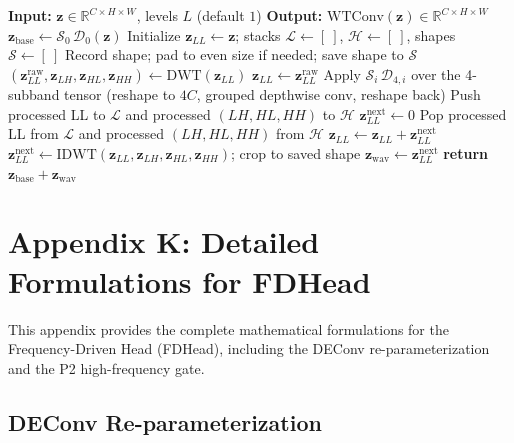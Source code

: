 \documentclass{article}
\theoremstyle{plain}
\theoremstyle{definition}
\theoremstyle{remark}
\begin{document}
 \begin{algorithm}[H]
 \caption{WTConv forward pass (used in LGE-W).}
 \label{alg:wtconv}
 \scriptsize
\begin{algorithmic}
   \STATE \textbf{Input:} $\mathbf{z}\in\mathbb{R}^{C\times H\times W}$, levels $L$ (default $1$)
   \STATE \textbf{Output:} $\mathrm{WTConv}(\mathbf{z})\in\mathbb{R}^{C\times H\times W}$
   \STATE $\mathbf{z}_{\mathrm{base}} \leftarrow \mathcal{S}_0\,\mathcal{D}_0(\mathbf{z})$ 
   \STATE Initialize $\mathbf{z}_{LL} \leftarrow \mathbf{z}$; stacks $\mathcal{L}\leftarrow[\ ]$, $\mathcal{H}\leftarrow[\ ]$, shapes $\mathcal{S}\leftarrow[\ ]$
     \STATE Record shape; pad to even size if needed; save shape to $\mathcal{S}$
     \STATE $(\mathbf{z}_{LL}^{\mathrm{raw}},\mathbf{z}_{LH},\mathbf{z}_{HL},\mathbf{z}_{HH}) \leftarrow \mathrm{DWT}(\mathbf{z}_{LL})$
     \STATE $\mathbf{z}_{LL} \leftarrow \mathbf{z}_{LL}^{\mathrm{raw}}$ 
     \STATE Apply $\mathcal{S}_i\,\mathcal{D}_{4,i}$ over the 4-subband tensor (reshape to $4C$, grouped depthwise conv, reshape back)
     \STATE Push processed LL to $\mathcal{L}$ and processed $(LH,HL,HH)$ to $\mathcal{H}$
   \ENDFOR
   \STATE $\mathbf{z}_{LL}^{\mathrm{next}} \leftarrow 0$
     \STATE Pop processed LL from $\mathcal{L}$ and processed $(LH,HL,HH)$ from $\mathcal{H}$
     \STATE $\mathbf{z}_{LL} \leftarrow \mathbf{z}_{LL} + \mathbf{z}_{LL}^{\mathrm{next}}$ 
     \STATE $\mathbf{z}_{LL}^{\mathrm{next}} \leftarrow \mathrm{IDWT}(\mathbf{z}_{LL},\mathbf{z}_{LH},\mathbf{z}_{HL},\mathbf{z}_{HH})$; crop to saved shape
   \ENDFOR
   \STATE $\mathbf{z}_{\mathrm{wav}} \leftarrow \mathbf{z}_{LL}^{\mathrm{next}}$
   \STATE \textbf{return} $\mathbf{z}_{\mathrm{base}} + \mathbf{z}_{\mathrm{wav}}$
 \end{algorithmic}
 \end{algorithm}

\section{Appendix K: Detailed Formulations for FDHead}
\label{sec:appendix_fdhead_details}

This appendix provides the complete mathematical formulations for the Frequency-Driven Head (FDHead), including the DEConv re-parameterization and the P2 high-frequency gate.

\subsection{DEConv Re-parameterization}
\end{document}
